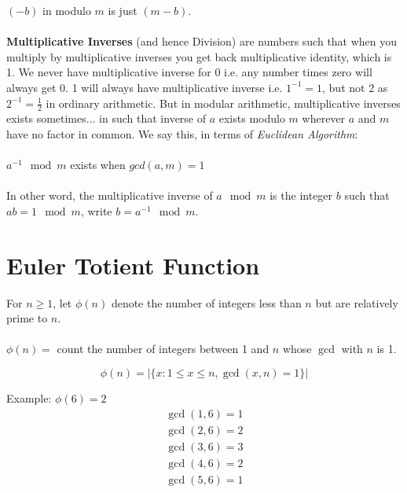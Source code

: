 \documentclass[a4paper]{article}
\begin{document}
$(-b)$ in modulo $m$ is just $(m - b)$.
\\
\\
\textbf{Multiplicative Inverses} (and hence Division) are numbers such that when you multiply by multiplicative inverses you get back multiplicative identity, which is 1. We never have multiplicative inverse for 0 i.e. any number times zero will always get 0. 1 will always have multiplicative inverse i.e. $1^{-1} = 1$, but not 2 as $2^{-1} = \frac{1}{2}$ in ordinary arithmetic. But in modular arithmetic, multiplicative inverses exists sometimes... in such that inverse of $a$ exists modulo $m$ wherever $a$ and $m$ have no factor in common. We say this, in terms of \textit{Euclidean Algorithm}:
\\
\\
$a^{-1} \mod m$ exists when $gcd(a, m) = 1$
\\
\\
In other word, the multiplicative inverse of $a \mod m$ is the integer $b$ such that $ab = 1 \mod m$, write $b = a^{-1} \mod m$. 


\section{Euler Totient Function}

For $n \geq 1$, let $\phi{(n)}$ denote the number of integers less than $n$ but are relatively prime to $n$.
\\
\\
$\phi{(n)} = $ count the number of integers between 1 and $n$ whose $\gcd$ with $n$ is 1.

\[ \phi{(n)} = |\{x:1 \leq x \leq n, \gcd(x, n) = 1\}| \]

Example: $\phi{(6)} = 2$
\begin{align*}
\gcd(1, 6) = 1 \\
\gcd(2, 6) = 2 \\
\gcd(3, 6) = 3 \\
\gcd(4, 6) = 2 \\
\gcd(5, 6) = 1
\end{align*}
\end{document}
